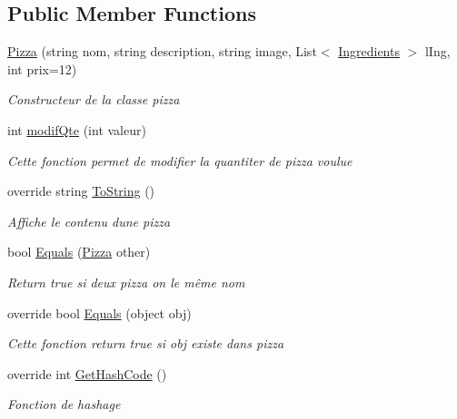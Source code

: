 \subsection*{Public Member Functions}
\begin{DoxyCompactItemize}
\item 
\hyperlink{classModele_1_1Pizza_aa413a214f45c475db7517a309bf3cff1}{Pizza} (string nom, string description, string image, List$<$ \hyperlink{namespaceModele_a001a8e89e56a724f24a249ba98080d41}{Ingredients} $>$ l\+Ing, int prix=12)
\begin{DoxyCompactList}\small\item\em Constructeur de la classe pizza \end{DoxyCompactList}\item 
int \hyperlink{classModele_1_1Pizza_a86b98da27e7ada45355e8576792d75c5}{modif\+Qte} (int valeur)
\begin{DoxyCompactList}\small\item\em Cette fonction permet de modifier la quantiter de pizza voulue \end{DoxyCompactList}\item 
override string \hyperlink{classModele_1_1Pizza_a5bcf4dd5b39ed12e3085aa2c92e9d33b}{To\+String} ()
\begin{DoxyCompactList}\small\item\em Affiche le contenu d\textquotesingle{}une pizza \end{DoxyCompactList}\item 
bool \hyperlink{classModele_1_1Pizza_aae4081338f65215bfcdc7845de6429e9}{Equals} (\hyperlink{classModele_1_1Pizza}{Pizza} other)
\begin{DoxyCompactList}\small\item\em Return true si deux pizza on le même nom \end{DoxyCompactList}\item 
override bool \hyperlink{classModele_1_1Pizza_a06040b5f95e6549d49667a84c490b2c8}{Equals} (object obj)
\begin{DoxyCompactList}\small\item\em Cette fonction return true si obj existe dans pizza \end{DoxyCompactList}\item 
override int \hyperlink{classModele_1_1Pizza_a15e2cc3fa52744672667a3877859948f}{Get\+Hash\+Code} ()
\begin{DoxyCompactList}\small\item\em Fonction de hashage \end{DoxyCompactList}\end{DoxyCompactItemize}
